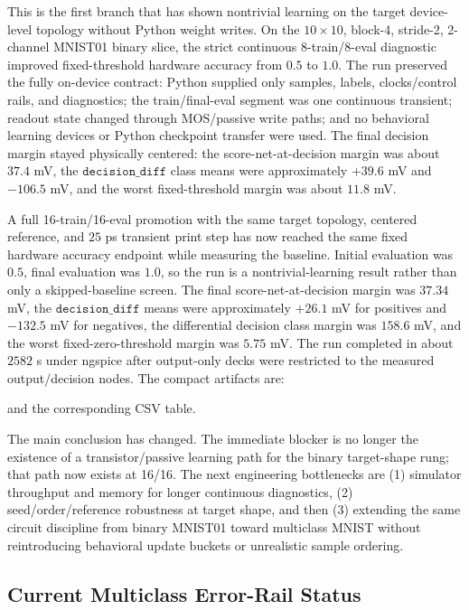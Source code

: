 \documentclass[11pt]{article}
\newcommand{\code}[1]{\texttt{#1}}
\begin{document}
This is the first branch that has shown nontrivial learning on the target
device-level topology without Python weight writes.  On the \(10\times10\),
block-4, stride-2, 2-channel MNIST01 binary slice, the strict continuous
8-train/8-eval diagnostic improved fixed-threshold hardware accuracy from
\(0.5\) to \(1.0\).  The run preserved the fully on-device contract: Python
supplied only samples, labels, clocks/control rails, and diagnostics; the
train/final-eval segment was one continuous transient; readout state changed
through MOS/passive write paths; and no behavioral learning devices or Python
checkpoint transfer were used.  The final decision margin stayed physically
centered: the score-net-at-decision margin was about \(37.4\) mV, the
\(\code{decision\_diff}\) class means were approximately \(+39.6\) mV and
\(-106.5\) mV, and the worst fixed-threshold margin was about \(11.8\) mV.

A full 16-train/16-eval promotion with the same target topology, centered
reference, and \(25\) ps transient print step has now reached the same fixed
hardware accuracy endpoint while measuring the baseline.  Initial evaluation
was \(0.5\), final evaluation was \(1.0\), so the run is a nontrivial-learning
result rather than only a skipped-baseline screen.  The final
score-net-at-decision margin was \(37.34\) mV, the
\(\code{decision\_diff}\) means were approximately \(+26.1\) mV for positives
and \(-132.5\) mV for negatives, the differential decision class margin was
\(158.6\) mV, and the worst fixed-zero-threshold margin was \(5.75\) mV.  The
run completed in about \(2582\) s under ngspice after output-only decks were
restricted to the measured output/decision nodes.  The compact artifacts are:
\begin{center}
\small
{}
\end{center}
and the corresponding CSV table.

The main conclusion has changed.  The immediate blocker is no longer the
existence of a transistor/passive learning path for the binary target-shape
rung; that path now exists at 16/16.  The next
engineering bottlenecks are (1) simulator throughput and memory for longer
continuous diagnostics, (2) seed/order/reference robustness at target shape,
and then (3) extending the same circuit discipline from binary MNIST01 toward
multiclass MNIST without reintroducing behavioral update buckets or unrealistic
sample ordering.

\subsection{Current Multiclass Error-Rail Status}
\end{document}
